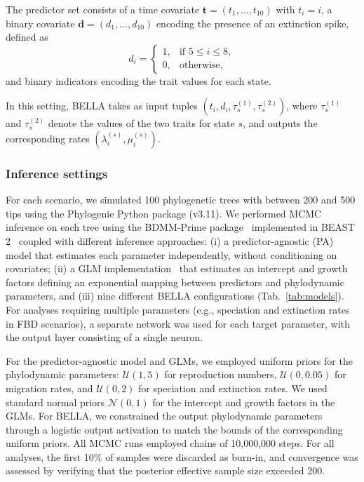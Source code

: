 The predictor set consists of a time covariate $\mathbf{t} = (t_1, \dots, t_{10})$ with $t_i = i$, a binary covariate $\mathbf{d} = (d_1, \dots, d_{10})$ encoding the presence of an extinction spike, defined as
\[
d_i =
\begin{cases}
1, & \text{if } 5 \le i \le 8, \\
0, & \text{otherwise},
\end{cases}
\]
and binary indicators encoding the trait values for each state.

In this setting, BELLA takes as input tuples $(t_i, d_i, \tau^{(1)}_s, \tau^{(2)}_s)$, where $\tau^{(1)}_s$ and $\tau^{(2)}_s$ denote the values of the two traits for state $s$, and outputs the corresponding rates $(\lambda^{(s)}_i, \mu^{(s)}_i)$.

\subsubsection{Inference settings}

For each scenario, we simulated 100 phylogenetic trees with between 200 and 500 tips using the Phylogenie Python package (v3.11). We performed MCMC inference on each tree using the BDMM-Prime package~\cite{Vaughan2025BDMM} implemented in BEAST 2~\cite{bouckaert2019beast} coupled with different inference approaches: (i) a predictor-agnostic (PA) model that estimates each parameter independently, without conditioning on covariates; (ii) a GLM implementation~\cite{cecivale_glmprior_2025} that estimates an intercept and growth factors defining an exponential mapping between predictors and phylodynamic parameters, and (iii) nine different BELLA configurations (Tab.~\ref{tab:models}).
For analyses requiring multiple parameters (e.g., speciation and extinction rates in FBD scenarios), a separate network was used for each target parameter, with the output layer consisting of a single neuron.

For the predictor-agnostic model and GLMs, we employed uniform priors for the phylodynamic parameters: \( \mathcal{U}(1, 5) \) for reproduction numbers,  \( \mathcal{U}(0, 0.05) \) for migration rates, and \( \mathcal{U}(0, 2) \) for speciation and extinction rates. 
We used standard normal priors \(\mathcal{N}(0, 1)\) for the intercept and growth factors in the GLMs. 
For BELLA, we constrained the output phylodynamic parameters through a logistic output activation to match the bounds of the corresponding uniform priors.
All MCMC runs employed chains of 10,000,000 steps. 
For all analyses, the first 10\% of samples were discarded as burn-in, and convergence was assessed by verifying that the posterior effective sample size exceeded 200.
